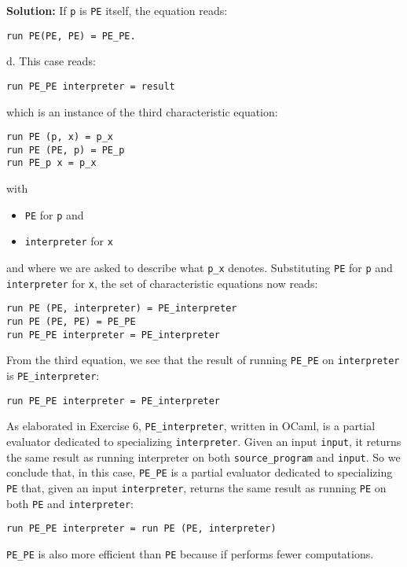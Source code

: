 \documentclass{article}
\begin{document}
\noindent \textbf{Solution:} \linebreak \linebreak
If \verb+p+ is \verb+PE+ itself, the equation reads:
\begin{lstlisting}
run PE(PE, PE) = PE_PE.
\end{lstlisting}
d. This case reads:
\begin{lstlisting}
run PE_PE interpreter = result
\end{lstlisting}
which is an instance of the third characteristic equation:
\begin{lstlisting}
run PE (p, x) = p_x
run PE (PE, p) = PE_p
run PE_p x = p_x
\end{lstlisting}
with 
\begin{itemize}
    \item \verb+PE+ for \verb+p+ and
    \item \verb+interpreter+ for \verb+x+
\end{itemize}
and where we are asked to describe what \verb+p_x+ denotes. \linebreak
Substituting \verb+PE+ for \verb+p+ and \verb+interpreter+ for \verb+x+, the set of characteristic equations now reads:
\begin{lstlisting}
run PE (PE, interpreter) = PE_interpreter
run PE (PE, PE) = PE_PE
run PE_PE interpreter = PE_interpreter
\end{lstlisting}
From the third equation, we see that the result of running \verb+PE_PE+ on \verb+interpreter+ is \verb+PE_interpreter+:
\begin{lstlisting}
run PE_PE interpreter = PE_interpreter
\end{lstlisting}
As elaborated in Exercise 6, \verb+PE_interpreter+, written in OCaml, is a partial evaluator dedicated to specializing \verb+interpreter+. Given an input \verb+input+, it returns the same result as running interpreter on both \verb+source_program+ and \verb+input+. \linebreak
So we conclude that, in this case, \verb+PE_PE+ is a partial evaluator dedicated to specializing \verb+PE+ that, given an input \verb+interpreter+, returns the same result as running \verb+PE+ on both \verb+PE+ and \verb+interpreter+:
\begin{lstlisting}
run PE_PE interpreter = run PE (PE, interpreter)
\end{lstlisting}
\verb+PE_PE+ is also more efficient than \verb+PE+ because if performs fewer computations.\linebreak \linebreak
\end{document}
